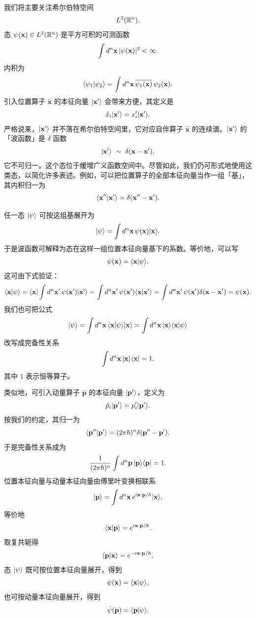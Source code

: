 我们将主要关注希尔伯特空间
\[
L^2(\mathbb{R}^n).
\]
态 $\psi(\mathbf{x})\in L^2(\mathbb{R}^n)$ 是平方可积的可测函数
\[
\int d^n\mathbf{x}\,|\psi(\mathbf{x})|^2<\infty.
\]
内积为
\[
\langle \psi_1|\psi_2\rangle=\int d^n\mathbf{x}\,
\overline{\psi_1(\mathbf{x})}\,\psi_2(\mathbf{x}).
\]
引入位置算子 $\hat{\mathbf{x}}$ 的本征向量 $|\mathbf{x}'\rangle$ 会带来方便，其定义是
\[
\hat x_i|\mathbf{x}'\rangle=x_i'|\mathbf{x}'\rangle.
\]
严格说来，$|\mathbf{x}'\rangle$ 并不落在希尔伯特空间里，它对应自伴算子 $\hat{\mathbf{x}}$ 的连续谱。$|\mathbf{x}'\rangle$ 的「波函数」是 $\delta$ 函数
\[
\ket{\mathbf{x}'}\ \sim\ \delta(\mathbf{x}-\mathbf{x}'),
\]
它不可归一。这个态位于缓增广义函数空间中。尽管如此，我们仍可形式地使用这类态，以简化许多表述。例如，可以把位置算子的全部本征向量当作一组「基」，其内积归一为
\[
\langle \mathbf{x}''|\mathbf{x}'\rangle=\delta(\mathbf{x}''-\mathbf{x}').
\]

任一态 $|\psi\rangle$ 可按这组基展开为
\[
|\psi\rangle=\int d^n\mathbf{x}\,\psi(\mathbf{x})|\mathbf{x}\rangle.
\]
于是波函数可解释为态在这样一组位置本征向量基下的系数。等价地，可以写
\[
\psi(\mathbf{x})=\langle \mathbf{x}|\psi\rangle.
\]
这可由下式验证：
\[
\langle \mathbf{x}|\psi\rangle
=\langle \mathbf{x}|\int d^n\mathbf{x}'\,\psi(\mathbf{x}')|\mathbf{x}'\rangle
=\int d^n\mathbf{x}'\,\psi(\mathbf{x}')\langle \mathbf{x}|\mathbf{x}'\rangle
=\int d^n\mathbf{x}'\,\psi(\mathbf{x}')\delta(\mathbf{x}-\mathbf{x}')
=\psi(\mathbf{x}).
\]
我们也可把公式
\[
|\psi\rangle=\int d^n\mathbf{x}\,\langle \mathbf{x}|\psi\rangle|\mathbf{x}\rangle
=\int d^n\mathbf{x}\,|\mathbf{x}\rangle\langle \mathbf{x}|\psi\rangle
\]
改写成完备性关系
\[
\int d^n\mathbf{x}\,|\mathbf{x}\rangle\langle \mathbf{x}|=1,
\]
其中 $1$ 表示恒等算子。

类似地，可引入动量算子 $\hat{\mathbf{p}}$ 的本征向量 $|\mathbf{p}'\rangle$，定义为
\[
\hat p_i|\mathbf{p}'\rangle=p_i'|\mathbf{p}'\rangle.
\]
按我们的约定，其归一为
\[
\langle \mathbf{p}''|\mathbf{p}'\rangle=(2\pi\hbar)^n\delta(\mathbf{p}''-\mathbf{p}').
\]
于是完备性关系成为
\[
\frac{1}{(2\pi\hbar)^n}\int d^n\mathbf{p}\,|\mathbf{p}\rangle\langle \mathbf{p}|=1.
\]
位置本征向量与动量本征向量由傅里叶变换相联系
\[
|\mathbf{p}\rangle=\int d^n\mathbf{x}\,e^{i\mathbf{x}\cdot\mathbf{p}/\hbar}|\mathbf{x}\rangle,
\]
等价地
\[
\langle \mathbf{x}|\mathbf{p}\rangle=e^{i\mathbf{x}\cdot\mathbf{p}/\hbar}.
\]
取复共轭得
\[
\langle \mathbf{p}|\mathbf{x}\rangle=e^{-i\mathbf{x}\cdot\mathbf{p}/\hbar}.
\]
态 $|\psi\rangle$ 既可按位置本征向量展开，得到
\[
\psi(\mathbf{x})=\langle \mathbf{x}|\psi\rangle,
\]
也可按动量本征向量展开，得到
\[
\hat\psi(\mathbf{p})=\langle \mathbf{p}|\psi\rangle.
\]

